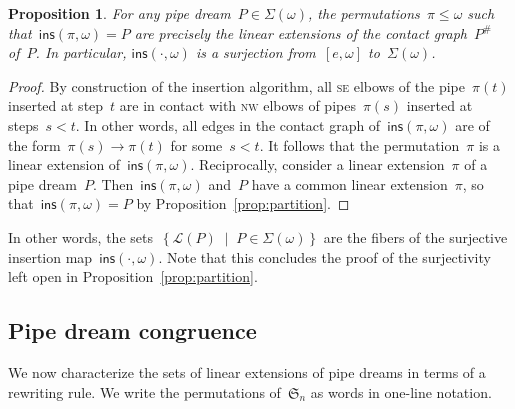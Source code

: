 \documentclass{amsart}
\newtheorem{proposition}[theorem]{Proposition}
\theoremstyle{definition}
\newcommand{\set}[2]{\left\{ #1 \;\middle|\; #2 \right\}} %
\newcommand{\fS}{\mathfrak{S}} %
\newcommand{\contact}{^\#} %
\newcommand{\se}{\textsc{se}} %
\newcommand{\nw}{\textsc{nw}} %
\newcommand{\insertion}[2]{\mathsf{ins}(#1,#2)} %
\newcommand{\acyclicPipeDreams}{\Sigma} %
\newcommand{\linearExtensions}{\mathcal{L}} %
\begin{document}
\begin{proposition}
\label{prop:fibersInsertion}
For any pipe dream~$P \in \acyclicPipeDreams(\omega)$,  the permutations~$\pi \le \omega$ such that~$\insertion{\pi}{\omega} = P$ are precisely the linear extensions of the contact graph~$P\contact$ of~$P$. In particular, $\insertion{\cdot}{\omega}$ is a surjection from~$[e, \omega]$ to~$\acyclicPipeDreams(\omega)$.
\end{proposition}

\begin{proof}
By construction of the insertion algorithm, all \se{} elbows of the pipe~$\pi(t)$ inserted at step~$t$ are in contact with \nw{} elbows of pipes~$\pi(s)$ inserted at steps~$s < t$. In other words, all edges in the contact graph of~$\insertion{\pi}{\omega}$ are of the form~$\pi(s) \to \pi(t)$ for some~$s < t$. It follows that the permutation~$\pi$ is a linear extension of~$\insertion{\pi}{\omega}$. Reciprocally, consider a linear extension~$\pi$ of a pipe dream~$P$. Then~$\insertion{\pi}{\omega}$ and~$P$ have a common linear extension~$\pi$, so that~$\insertion{\pi}{\omega} = P$ by Proposition~\ref{prop:partition}.
\end{proof}

In other words, the sets~$\set{\linearExtensions(P)}{P \in \acyclicPipeDreams(\omega)}$ are the fibers of the surjective insertion map~$\insertion{\cdot}{\omega}$. Note that this concludes the proof of the surjectivity left open in Proposition~\ref{prop:partition}.


\subsection{Pipe dream congruence}
\label{subsec:pipeDreamCongruence}

We now characterize the sets of linear extensions of pipe dreams in terms of a rewriting rule. We write the permutations of~$\fS_n$ as words in one-line notation.
\end{document}
